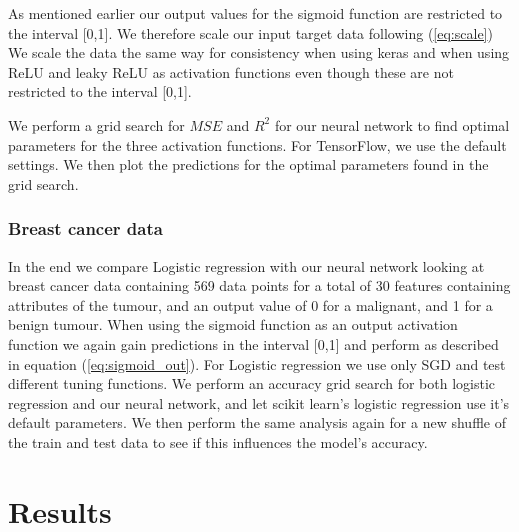 \documentclass[11pt]{article}
\begin{document}
As mentioned earlier our output values for the sigmoid function are restricted to the interval [0,1]. We therefore scale our input target data following (\ref{eq:scale})
We scale the data the same way for consistency when using keras and when using ReLU and leaky ReLU as activation functions even though these are not restricted to the interval [0,1].

We perform a grid search for $MSE$ and $R^2$ for our neural network to find optimal parameters for the three activation functions. For TensorFlow, we use the default settings. We then plot the predictions for the optimal parameters found in the grid search.

\subsubsection*{Breast cancer data}
In the end we compare Logistic regression with our neural network looking at breast cancer data containing 569 data points for a total of 30 features containing attributes of the tumour, and an output value of 0 for a malignant, and 1 for a benign tumour. When using the sigmoid function as an output activation function we again gain predictions in the interval [0,1] and perform as described in equation (\ref{eq:sigmoid_out}). For Logistic regression we use only SGD and test different tuning functions. We perform an accuracy grid search for both logistic regression and our neural network, and let scikit learn's logistic regression use it's default parameters. We then perform the same analysis again for a new shuffle of the train and test data to see if this influences the model's accuracy.
\newline
\newline

\section{Results}
\end{document}
